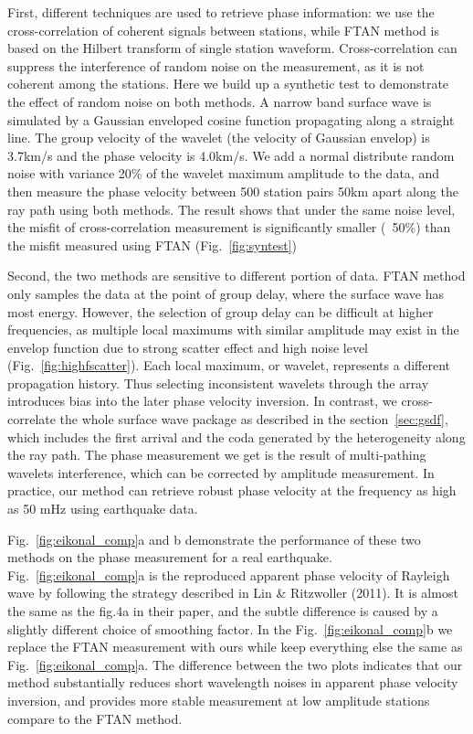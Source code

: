 \documentclass[referee]{gji}
\begin{document}
First, different techniques are used to retrieve phase information: we use the cross-correlation of coherent signals between stations, while FTAN method is based on the Hilbert transform of single station waveform. Cross-correlation can suppress the interference of random noise on the measurement, as it is not coherent among the stations. Here we build up a synthetic test to demonstrate the effect of random noise on both methods. A narrow band surface wave is simulated by a Gaussian enveloped cosine function propagating along a straight line. The group velocity of the wavelet (the velocity of Gaussian envelop) is 3.7km/s and the phase velocity is 4.0km/s. We add a normal distribute random noise with variance 20\% of the wavelet maximum amplitude to the data, and then measure the phase velocity between 500 station pairs 50km apart along the ray path using both methods. The result shows that under the same noise level, the misfit of cross-correlation measurement is significantly smaller (~50\%) than the misfit measured using FTAN (Fig.~\ref{fig:syntest})

Second, the two methods are sensitive to different portion of data. FTAN method only samples the data at the point of group delay, where the surface wave has most energy. However, the selection of group delay can be difficult at higher frequencies, as multiple local maximums with similar amplitude may exist in the envelop function due to strong scatter effect and high noise level (Fig.~\ref{fig:highfscatter}). Each local maximum, or wavelet, represents a different propagation history. Thus selecting inconsistent wavelets through the array introduces bias into the later phase velocity inversion. In contrast, we cross-correlate the whole surface wave package as described in the section~\ref{sec:gsdf}, which includes the first arrival and the coda generated by the heterogeneity along the ray path. The phase measurement we get is the result of multi-pathing wavelets interference, which can be corrected by amplitude measurement. In practice, our method can retrieve robust phase velocity at the frequency as high as 50 mHz using earthquake data.

Fig.~\ref{fig:eikonal_comp}a and b demonstrate the performance of these two methods on the phase measurement for a real earthquake. Fig.~\ref{fig:eikonal_comp}a is the reproduced apparent phase velocity of Rayleigh wave by following the strategy described in Lin \& Ritzwoller (2011). It is almost the same as the fig.4a in their paper, and the subtle difference is caused by a slightly different choice of smoothing factor. In the Fig.~\ref{fig:eikonal_comp}b we replace the FTAN measurement with ours while keep everything else the same as Fig.~\ref{fig:eikonal_comp}a. The difference between the two plots indicates that our method substantially reduces short wavelength noises in apparent phase velocity inversion, and provides more stable measurement at low amplitude stations compare to the FTAN method. 
\end{document}
